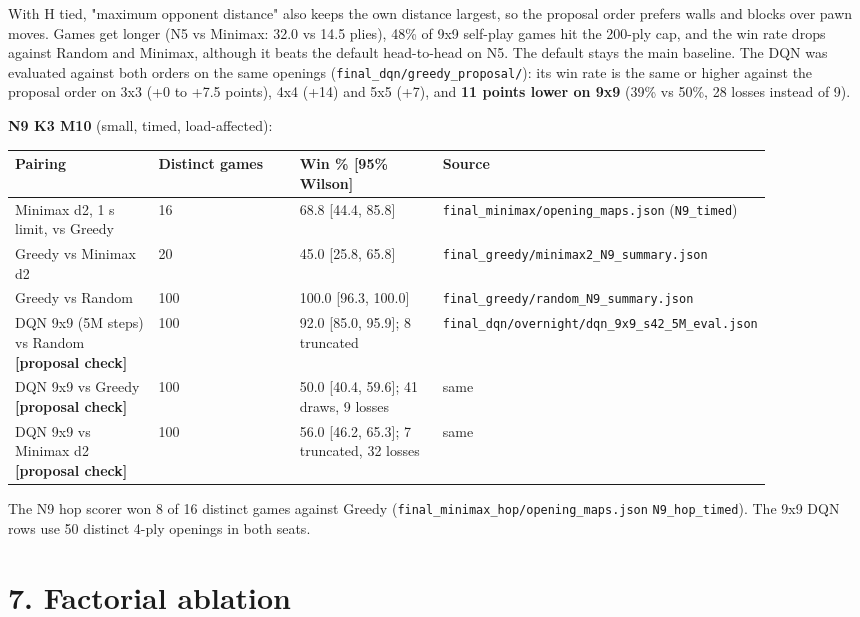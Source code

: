 \documentclass[11pt]{article}
\begin{document}
With H tied, "maximum opponent distance" also keeps the own distance largest, so the proposal
order prefers walls and blocks over pawn moves. Games get longer (N5 vs Minimax: 32.0 vs 14.5
plies), 48\% of 9x9 self-play games hit the 200-ply cap, and the win rate drops against Random
and Minimax, although it beats the default head-to-head on N5. The default stays the main
baseline. The DQN was evaluated against both orders on the same openings
(\texttt{final\_dqn/greedy\_proposal/}): its win rate is the same or higher against the proposal order on
3x3 (+0 to +7.5 points), 4x4 (+14) and 5x5 (+7), and \textbf{11 points lower on 9x9} (39\% vs 50\%,
28 losses instead of 9).

\textbf{N9 K3 M10} (small, timed, load-affected):

\begin{center}\scriptsize
\begin{longtable}{p{0.22\linewidth}p{0.22\linewidth}p{0.22\linewidth}p{0.22\linewidth}}
\toprule
Pairing & Distinct games & Win \% [95\% Wilson] & Source \\
\midrule
Minimax d2, 1 s limit, vs Greedy & 16 & 68.8 [44.4, 85.8] & \texttt{final\_minimax/opening\_maps.json} (\texttt{N9\_timed}) \\
Greedy vs Minimax d2 & 20 & 45.0 [25.8, 65.8] & \texttt{final\_greedy/minimax2\_N9\_summary.json} \\
Greedy vs Random & 100 & 100.0 [96.3, 100.0] & \texttt{final\_greedy/random\_N9\_summary.json} \\
DQN 9x9 (5M steps) vs Random \textbf{[proposal check]} & 100 & 92.0 [85.0, 95.9]; 8 truncated & \texttt{final\_dqn/overnight/dqn\_9x9\_s42\_5M\_eval.json} \\
DQN 9x9 vs Greedy \textbf{[proposal check]} & 100 & 50.0 [40.4, 59.6]; 41 draws, 9 losses & same \\
DQN 9x9 vs Minimax d2 \textbf{[proposal check]} & 100 & 56.0 [46.2, 65.3]; 7 truncated, 32 losses & same \\
\bottomrule
\end{longtable}
\end{center}

The N9 hop scorer won 8 of 16 distinct games against Greedy (\texttt{final\_minimax\_hop/opening\_maps.json}
\texttt{N9\_hop\_timed}). The 9x9 DQN rows use 50 distinct 4-ply openings in both seats.

\section{7. Factorial ablation}
\end{document}
